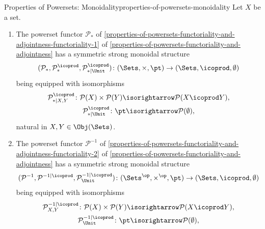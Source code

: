 \begin{proposition}{Properties of Powersets: Monoidality}{properties-of-powersets-monoidality}%
    Let $X$ be a set.
    \begin{enumerate}
        \item\label{properties-of-powersets-monoidality-symmetric-strong-monoidality-with-respect-to-coproducts-1}The powerset functor $\mathcal{P}_{*}$ of \cref{properties-of-powersets-functoriality-and-adjointness-functoriality-1} of \cref{properties-of-powersets-functoriality-and-adjointness} has a symmetric strong monoidal structure
            \[
                (\mathcal{P}_{*},\mathcal{P}^{\icoprod}_{*},\mathcal{P}^{\icoprod}_{*|\Unit})
                \colon
                (\Sets,\times,\pt)
                \to
                (\Sets,\icoprod,\emptyset)
            \]%
            being equipped with isomorphisms%
            \[
                \begin{gathered}
                    \mathcal{P}^{\icoprod}_{*|X,Y}   \colon \mathcal{P}(X)\times\mathcal{P}(Y) \isorightarrow    \mathcal{P}(X\icoprod Y),\\
                    \mathcal{P}^{\icoprod}_{*|\Unit} \colon \pt                                \isorightarrow    \mathcal{P}(\emptyset),
                \end{gathered}
            \]%
            natural in $X,Y\in\Obj(\Sets)$.
        \item\label{properties-of-powersets-monoidality-symmetric-strong-monoidality-with-respect-to-coproducts-2}The powerset functor $\mathcal{P}^{-1}$ of \cref{properties-of-powersets-functoriality-and-adjointness-functoriality-2} of \cref{properties-of-powersets-functoriality-and-adjointness} has a symmetric strong monoidal structure
            \[
                (\mathcal{P}^{-1},\mathcal{P}^{-1|\icoprod},\mathcal{P}^{-1|\icoprod}_{\Unit})
                \colon
                (\Sets^{\op},\times^{\op},\pt)
                \to
                (\Sets,\icoprod,\emptyset)
            \]%
            being equipped with isomorphisms%
            \[
                \begin{gathered}
                    \mathcal{P}^{-1|\icoprod}_{X,Y}   \colon \mathcal{P}(X)\times\mathcal{P}(Y) \isorightarrow    \mathcal{P}(X\icoprod Y),\\
                    \mathcal{P}^{-1|\icoprod}_{\Unit} \colon \pt                                \isorightarrow    \mathcal{P}(\emptyset),

\end{gathered}\]
\end{enumerate}
\end{proposition}

